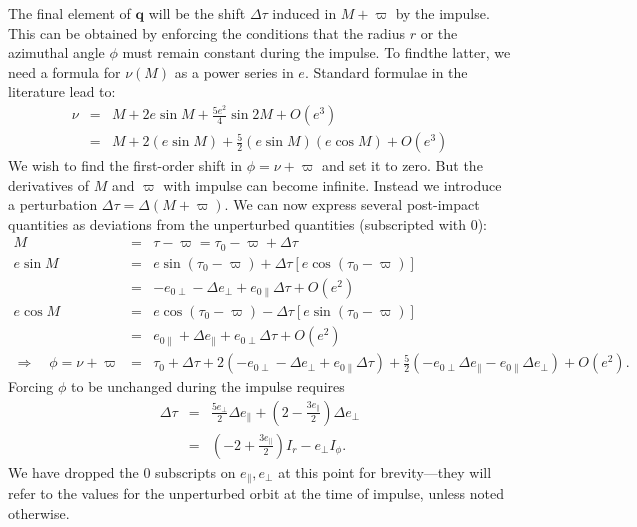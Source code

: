 \documentclass[linenumbers, onecolumn]{aastex631}
\newcommand{\vecq}{\mathbf{q}}
\newcommand{\lop}{\varpi}
\begin{document}
The final element of $\vecq$ will be the shift $\Delta\tau$ induced in $M+\lop$ by the impulse.  This can be obtained by enforcing the conditions that the radius $r$ or the azimuthal angle $\phi$ must remain constant during the impulse.  To findthe latter, we need a formula for $\nu(M)$ as a power series in $e.$  Standard formulae in the literature lead to:
\begin{eqnarray}
  \nu & = & M + 2e \sin M + \frac{5e^2}{4} \sin 2M + O(e^3) \\
  \label{eq:nue2}
    & = & M + 2(e\sin M) + \frac{5}{2} (e \sin M) (e \cos M) + O(e^3) 
\end{eqnarray}
We wish to find the first-order shift in $\phi=\nu + \lop$ and set it to zero.  But the derivatives of $M$ and $\lop$ with impulse can become infinite.  Instead we introduce a perturbation $\Delta\tau = \Delta(M+\lop).$ We can now express several post-impact quantities as deviations from the unperturbed quantities (subscripted with 0):
\begin{eqnarray}
  M & = & \tau-\lop = \tau_0 -\lop + \Delta\tau \\
  e \sin M & = & e \sin (\tau_0 -\lop) + \Delta\tau \left[ e \cos  (\tau_0 -\lop)\right] \\
    & = & -e_{0\perp}-\Delta e_\perp + e_{0\parallel} \Delta\tau +O(e^2) \\
  e \cos M & = & e \cos (\tau_0 -\lop) - \Delta\tau \left[ e \sin  (\tau_0 -\lop)\right] \\
    & = & e_{0\parallel}+\Delta e_\parallel + e_{0\perp} \Delta\tau +O(e^2) \\
\Rightarrow \quad \phi =\nu+\lop & = & \tau_0 + \Delta \tau + 2( -e_{0\perp}-\Delta e_\perp + e_{0\parallel} \Delta\tau )
                              + \frac{5}{2}\left( -e_{0\perp}\Delta e_\parallel-e_{0\parallel}\Delta e_\perp\right) + O(e^2).
\end{eqnarray}
Forcing $\phi$ to be unchanged during the impulse requires
\begin{eqnarray}
  \Delta\tau & = & \frac{5 e_\perp}{2} \Delta e_\parallel + \left(2-\frac{3e_\parallel}{2}\right) \Delta e_\perp \\
             & = & \left(-2+\frac{3e_\parallel}{2}\right) I_r - e_\perp I_\phi.
                   \label{eq:dtau0}
\end{eqnarray}
We have dropped the 0 subscripts on $e_\parallel,e_\perp$ at this point for brevity---they will refer to the values for the unperturbed orbit at the time of impulse, unless noted otherwise.
\end{document}
